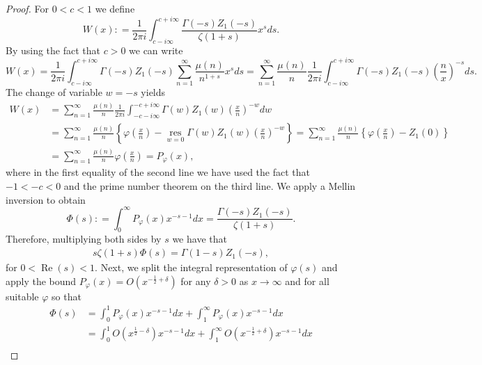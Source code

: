 \documentclass[11pt]{article}
\numberwithin{equation}{section}		 			%
\numberwithin{figure}{section}			 			%
\begin{document}
\begin{proof}
\noindent For $0<c<1$ we define
\[W(x): = \frac{1}{{2\pi i}}\int_{c - i\infty }^{c + i\infty } {\frac{{\Gamma ( - s){Z_1}( - s)}}{{\zeta (1 + s)}}{x^s}ds}. \]
By using the fact that $c>0$ we can write
\[W(x) = \frac{1}{{2\pi i}}\int_{c - i\infty }^{c + i\infty } {\Gamma ( - s){Z_1}( - s)\sum\limits_{n = 1}^\infty  {\frac{{\mu (n)}}{{{n^{1 + s}}}}} {x^s}ds}  = \sum\limits_{n = 1}^\infty  {\frac{{\mu (n)}}{n}\frac{1}{{2\pi i}}\int_{c - i\infty }^{c + i\infty } {\Gamma ( - s){Z_1}( - s){{\left( {\frac{n}{x}} \right)}^{ - s}}ds} }. \]
The change of variable $w=-s$ yields
\begin{align}
  W(x) &= \sum\limits_{n = 1}^\infty  {\frac{{\mu (n)}}{n}\frac{1}{{2\pi i}}\int_{ - c - i\infty }^{ - c + i\infty } {\Gamma (w){Z_1}(w){{\left( {\frac{x}{n}} \right)}^{ - w}}dw} }  \nonumber \\
   &= \sum\limits_{n = 1}^\infty  {\frac{{\mu (n)}}{n}\left\{ {\varphi \left( {\frac{x}{n}} \right) - \mathop {\operatorname{res} }\limits_{w = 0} \Gamma (w){Z_1}(w){{\left( {\frac{x}{n}} \right)}^{ - w}}} \right\}}  = \sum\limits_{n = 1}^\infty  {\frac{{\mu (n)}}{n}\left\{ {\varphi \left( {\frac{x}{n}} \right) - {Z_1}(0)} \right\}}  \nonumber \\
   &= \sum\limits_{n = 1}^\infty  {\frac{{\mu (n)}}{n}\varphi \left( {\frac{x}{n}} \right)}  = {P_\varphi }(x), \nonumber 
\end{align}
where in the first equality of the second line we have used the fact that $- 1 <  - c < 0$ and the prime number theorem on the third line. We apply a Mellin inversion to obtain
\[\Phi (s): = \int_0^\infty  {{P_\varphi }(x){x^{ - s - 1}}dx}  = \frac{{\Gamma ( - s){Z_1}( - s)}}{{\zeta (1 + s)}}.\]
Therefore, multiplying both sides by $s$ we have that 
\begin{align} \label{deductionRH}
{s\zeta (1 + s)\Phi (s) = \Gamma (1 - s){Z_1}( - s)},
\end{align}
for $0 < \operatorname{Re} (s) < 1$. Next, we split the integral representation of $\varphi(s)$ and apply the bound ${P_\varphi }(x) = O({x^{ - \tfrac{1}{2} + \delta }})$ for any $\delta >0$ as $x \to \infty$ and for all suitable $\varphi$ so that
\begin{align}
  \Phi (s) & = \int_0^1 {{P_\varphi }(x){x^{ - s - 1}}dx}  + \int_1^\infty  {{P_\varphi }(x){x^{ - s - 1}}dx}  \nonumber \\
   &= \int_0^1 {O({x^{\tfrac{1}{2} - \delta }}){x^{ - s - 1}}dx}  + \int_1^\infty  {O({x^{ - \tfrac{1}{2} + \delta }}){x^{ - s - 1}}dx}  \nonumber \\

\end{align}
\end{proof}
\end{document}
